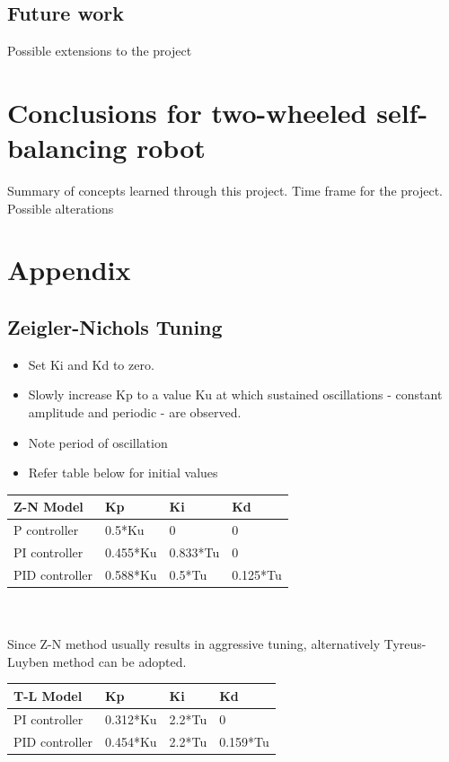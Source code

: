\documentclass[paper=a4, fontsize=11pt]{scrartcl}
\numberwithin{equation}{section}        %
\numberwithin{figure}{section}          %
\numberwithin{table}{section}           %
\begin{document}
\subsection{Future work}
Possible extensions to the project

\section{Conclusions for two-wheeled self-balancing robot}
Summary of concepts learned through this project.
Time frame for the project.
Possible alterations

\section{Appendix}
\subsection{Zeigler-Nichols Tuning}
\begin{itemize}
\item Set Ki and Kd to zero.
\item Slowly increase Kp to a value Ku at which sustained oscillations - constant amplitude and periodic - are observed.
\item Note period of oscillation
\item Refer table below for initial values
\end{itemize}

\begin{tabular}{|l|l|l|l|}
\hline
       Z-N Model      & Kp       & Ki       & Kd       \\      
\hline
       P controller   & 0.5*Ku   & 0        & 0        \\
\hline
       PI controller  & 0.455*Ku & 0.833*Tu & 0        \\
\hline
       PID controller & 0.588*Ku & 0.5*Tu   & 0.125*Tu \\
\hline
\end{tabular}
\\
\\
Since Z-N method usually results in aggressive tuning, alternatively Tyreus-Luyben method can be adopted.
\\
\begin{tabular}{|l|l|l|l|}
\hline
       T-L Model      & Kp       & Ki     & Kd       \\
\hline
       PI controller  & 0.312*Ku & 2.2*Tu & 0        \\
\hline
       PID controller & 0.454*Ku & 2.2*Tu & 0.159*Tu \\
\hline
\end{tabular}
\end{document}
